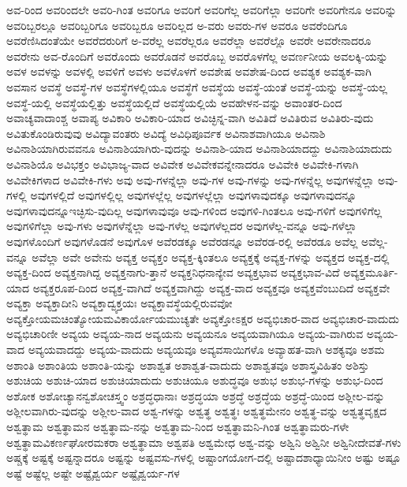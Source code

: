 {ಅವ-ರಿಂದ
ಅವರಿಂದಲೇ
ಅವರಿ-ಗಿಂತ
ಅವರಿಗೂ
ಅವರಿಗೆ
ಅವರಿಗೆಲ್ಲ
ಅವರಿಗೆಲ್ಲಾ
ಅವರಿಗೇ
ಅವರಿಗೇನೂ
ಅವರಿನ್ನು
ಅವರಿಬ್ಬರಲ್ಲೂ
ಅವರಿಬ್ಬರಿಗೂ
ಅವರಿಬ್ಬರೂ
ಅವರಿಲ್ಲದ
ಅ-ವರು
ಅವರು-ಗಳ
ಅವರೂ
ಅವರೆಂದಿಗೂ
ಅವರೆಣಿಸಿದಂತೆಯೇ
ಅವರೆದರುರಿಗೆ
ಅ-ವರೆಲ್ಲ
ಅವರೆಲ್ಲರೂ
ಅವರೆಲ್ಲಾ
ಅವರೆಲ್ಲೊ
ಅವರೇ
ಅವರೇನಾದರೂ
ಅವರೇನು
ಅವ-ರೊಂದಿಗೆ
ಅವರೊಂದು
ಅವರೊಡನೆ
ಅವರೊಬ್ಬ
ಅವರೊಳಗೆಲ್ಲ
ಅವರ್ಣನೀಯ
ಅವಲಕ್ಕಿ-ಯನ್ನು
ಅವಳ
ಅವಳನ್ನು
ಅವಳಲ್ಲಿ
ಅವಳಿಗೆ
ಅವಳು
ಅವಳೊಳಗೆ
ಅವಶೇಷ
ಅವಶೇಷ-ದಿಂದ
ಅವಶ್ಯಕ
ಅವಶ್ಯಕ-ವಾಗಿ
ಅವಸಾನ
ಅವಸ್ಥೆ
ಅವಸ್ಥೆ-ಗಳ
ಅವಸ್ಥೆಗಳಲ್ಲಿಯೂ
ಅವಸ್ಥೆಗೆ
ಅವಸ್ಥೆಯ
ಅವಸ್ಥೆ-ಯಂತೆ
ಅವಸ್ಥೆ-ಯನ್ನು
ಅವಸ್ಥೆ-ಯಲ್ಲ
ಅವಸ್ಥೆ-ಯಲ್ಲಿ
ಅವಸ್ಥೆಯಲ್ಲಿತ್ತು
ಅವಸ್ಥೆಯಲ್ಲಿದೆ
ಅವಸ್ಥೆಯಲ್ಲಿಯೆ
ಅವಹೇಳನ-ವನ್ನು
ಅವಾಂತರ-ದಿಂದ
ಅವಾಚ್ಯವಾದಾಂಶ್ಚ
ಅವಾಪ್ಯ
ಅವಿಕಾರಿ
ಅವಿಕಾರಿ-ಯಾದ
ಅವಿಚ್ಛಿನ್ನ-ವಾಗಿ
ಅವಿತಿದೆ
ಅವಿತಿರುವ
ಅವಿತಿರು-ವುದು
ಅವಿತುಕೊಂಡಿರುವುವು
ಅವಿದ್ಯಾವಂತರು
ಅವಿದ್ಯೆ
ಅವಿಧಿಪೂರ್ವಕ
ಅವಿನಾಶವಾಗಿಯೂ
ಅವಿನಾಶಿ
ಅವಿನಾಶಿಯಾಗಿರುವವನೂ
ಅವಿನಾಶಿಯಾಗಿರು-ವುದನ್ನು
ಅವಿನಾಶಿ-ಯಾದ
ಅವಿನಾಶಿಯಾದದ್ದು
ಅವಿನಾಶಿಯಾದುದು
ಅವಿನಾಶಿಯೊ
ಅವಿಭಕ್ತಂ
ಅವಿಭಾಜ್ಯ-ವಾದ
ಅವಿವೇಕ
ಅವಿವೇಕವನ್ನೇನಾದರೂ
ಅವಿವೇಕಿ
ಅವಿವೇಕಿ-ಗಳಾಗಿ
ಅವಿವೇಕಿಗಳಾದ
ಅವಿವೇಕಿ-ಗಳು
ಅವು
ಅವು-ಗಳನ್ನೆಲ್ಲಾ
ಅವು-ಗಳ
ಅವು-ಗಳನ್ನು
ಅವು-ಗಳನ್ನೆಲ್ಲ
ಅವುಗಳನ್ನೆಲ್ಲಾ
ಅವು-ಗಳಲ್ಲಿ
ಅವುಗಳಲ್ಲಿದೆ
ಅವುಗಳಲ್ಲಿಲ್ಲ
ಅವುಗಳಲ್ಲೆಲ್ಲ
ಅವುಗಳಲ್ಲೆಲ್ಲಾ
ಅವುಗಳಾವುದಕ್ಕೂ
ಅವುಗಳಾವುದನ್ನೂ
ಅವುಗಳಾವುದನ್ನೂಇಚ್ಛಿಸು-ವುದಿಲ್ಲ
ಅವುಗಳಾವುವೂ
ಅವು-ಗಳಿಂದ
ಅವುಗಳಿ-ಗಿಂತಲೂ
ಅವು-ಗಳಿಗೆ
ಅವುಗಳಿಗೆಲ್ಲ
ಅವುಗಳಿಗೆಲ್ಲಾ
ಅವು-ಗಳು
ಅವುಗಳೆನ್ನೆಲ್ಲಾ
ಅವು-ಗಳೆಲ್ಲ
ಅವುಗಳೆಲ್ಲದರ
ಅವುಗಳೆಲ್ಲ-ವನ್ನೂ
ಅವು-ಗಳೆಲ್ಲಾ
ಅವುಗಳೊಂದಿಗೆ
ಅವುಗಳೊಡನೆ
ಅವುಗೊಳ
ಅವೆರಡಕ್ಕೂ
ಅವೆರಡನ್ನೂ
ಅವೆರಡ-ರಲ್ಲಿ
ಅವೆರಡೂ
ಅವೆಲ್ಲ
ಅವೆಲ್ಲ-ವನ್ನೂ
ಅವೆಲ್ಲಾ
ಅವೇ
ಅವೇನು
ಅವ್ಯಕ್ತ
ಅವ್ಯಕ್ತಂ
ಅವ್ಯಕ್ತ-ಕ್ಕಿಂತಲೂ
ಅವ್ಯಕ್ತಕ್ಕೆ
ಅವ್ಯಕ್ತ-ಗಳನ್ನು
ಅವ್ಯಕ್ತದ
ಅವ್ಯಕ್ತ-ದಲ್ಲಿ
ಅವ್ಯಕ್ತ-ದಿಂದ
ಅವ್ಯಕ್ತನಾಗಿದ್ದ
ಅವ್ಯಕ್ತನಾಗು-ತ್ತಾನೆ
ಅವ್ಯಕ್ತನಿಧನಾನ್ಯೇವ
ಅವ್ಯಕ್ತಭಾವ
ಅವ್ಯಕ್ತಭಾವ-ವಿದೆ
ಅವ್ಯಕ್ತಮೂರ್ತಿ-ಯಾದ
ಅವ್ಯಕ್ತರೂಪ-ದಿಂದ
ಅವ್ಯಕ್ತ-ವಾಗಿದೆ
ಅವ್ಯಕ್ತವಾಗಿದ್ದು
ಅವ್ಯಕ್ತ-ವಾದ
ಅವ್ಯಕ್ತವೂ
ಅವ್ಯಕ್ತವೆಂಬುದಿದೆ
ಅವ್ಯಕ್ತವೇ
ಅವ್ಯಕ್ತಾ
ಅವ್ಯಕ್ತಾದೀನಿ
ಅವ್ಯಕ್ತಾದ್ವ್ಯಕ್ತಯಃ
ಅವ್ಯಕ್ತಾವಸ್ಥೆಯಲ್ಲಿರುವವೋ
ಅವ್ಯಕ್ತೋಯಮಚಿಂತ್ಯೋಯಮವಿಕಾರ್ಯೋಯಮುಚ್ಯತೇ
ಅವ್ಯಕ್ತೋಽಕ್ಷರ
ಅವ್ಯಭಿಚಾರ-ವಾದ
ಅವ್ಯಭಿಚಾರ-ವಾದುದು
ಅವ್ಯಭಿಚಾರಿಣೀ
ಅವ್ಯಯ
ಅವ್ಯಯ-ನಾದ
ಅವ್ಯಯನು
ಅವ್ಯಯನೂ
ಅವ್ಯಯವಾಗಿಯೂ
ಅವ್ಯಯ-ವಾಗಿರುವ
ಅವ್ಯಯ-ವಾದ
ಅವ್ಯಯವಾದದ್ದು
ಅವ್ಯಯ-ವಾದುದು
ಅವ್ಯಯವೂ
ಅವ್ಯವಸಾಯಿಗಳೊ
ಅವ್ಯಾಹತ-ವಾಗಿ
ಅಶಕ್ಯವೂ
ಅಶಮ
ಅಶಾಂತಿ
ಅಶಾಂತಿಯ
ಅಶಾಂತಿ-ಯನ್ನು
ಅಶಾಶ್ವತ
ಅಶಾಶ್ವತ-ವಾದುದು
ಅಶಾಶ್ವತವೂ
ಅಶಾಸ್ತ್ರವಿಹಿತಂ
ಅಶಿಸ್ತು
ಅಶುಚಿಯ
ಅಶುಚಿ-ಯಾದ
ಅಶುಚಿಯಾದುದು
ಅಶುಚಿಯೂ
ಅಶುದ್ಧವೂ
ಅಶುಭ
ಅಶುಭ-ಗಳನ್ನು
ಅಶುಭ-ದಿಂದ
ಅಶೋಕ
ಅಶೋಚ್ಯಾನನ್ವಶೋಚಸ್ತ್ವಂ
ಅಶ್ರದ್ಧಧಾನಾಃ
ಅಶ್ರದ್ಧಯಾ
ಅಶ್ರದ್ಧೆ
ಅಶ್ರದ್ಧೆಯ
ಅಶ್ರದ್ಧೆ-ಯಿಂದ
ಅಶ್ಲೀಲ-ವನ್ನು
ಅಶ್ಲೀಲವಾಗಿರು-ವುದನ್ನು
ಅಶ್ಲೀಲ-ವಾದ
ಅಶ್ವ-ಗಳನ್ನು
ಅಶ್ವತ್ಥ
ಅಶ್ವತ್ಥಃ
ಅಶ್ವತ್ಥಮೇನಂ
ಅಶ್ವತ್ಥ-ವನ್ನು
ಅಶ್ವತ್ಥವೃಕ್ಷದ
ಅಶ್ವತ್ಥಾಮ
ಅಶ್ವತ್ಥಾಮನ
ಅಶ್ವತ್ಥಾಮ-ನನ್ನು
ಅಶ್ವತ್ಥಾಮ-ನಿಂದ
ಅಶ್ವತ್ಥಾಮನಿ-ಗಿಂತ
ಅಶ್ವತ್ಥಾಮರು-ಗಳೇ
ಅಶ್ವತ್ಥಾಮವಿಕರ್ಣಘೋರಮಕರಾ
ಅಶ್ವತ್ಥಾಮಾ
ಅಶ್ವಪತಿ
ಅಶ್ವಮೇಧ
ಅಶ್ವ-ವನ್ನು
ಅಶ್ವಿನಿ
ಅಶ್ವಿನೀ
ಅಶ್ವಿನೀದೇವತೆ-ಗಳು
ಅಷ್ಚಕ್ಕೆ
ಅಷ್ಟಕ್ಕೆ
ಅಷ್ಟನ್ನಾದರೂ
ಅಷ್ಟನ್ನು
ಅಷ್ಟವಸು-ಗಳಲ್ಲಿ
ಅಷ್ಟಾಂಗಯೋಗ-ದಲ್ಲಿ
ಅಷ್ಟಾದಶಾಧ್ಯಾಯಿನೀಂ
ಅಷ್ಟು
ಅಷ್ಟೂ
ಅಷ್ಟೆ
ಅಷ್ಟೆಲ್ಲ
ಅಷ್ಟೇ
ಅಷ್ಟೈಶ್ವರ್ಯ
ಅಷ್ಟೈಶ್ವರ್ಯ-ಗಳ
}
